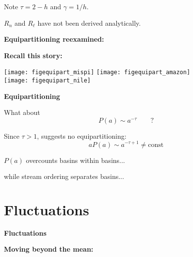 \begin{frame}[label=]
\begin{frame}[label=]
\begin{frame}[label=]
\begin{frame}[label=]
\begin{frame}[label=]
\begin{frame}[label=]
\begin{frame}[label=]
\begin{frame}[label=]
\begin{frame}[label=]
\begin{frame}[label=]
\begin{frame}[label=]
\begin{frame}[label=]
\begin{frame}[label=]
\begin{frame}[label=]
\begin{frame}[label=]
\begin{frame}[label=]
\begin{frame}[label=]
\begin{frame}[label=]
\begin{frame}[label=]
\begin{frame}[label=]
\begin{frame}[label=]
\begin{frame}[label=]
\begin{frame}[label=]
\begin{frame}[label=]
\begin{frame}[label=]
\begin{frame}[label=]
\begin{frame}[label=]
\begin{frame}[label=]
\begin{frame}[label=]
\begin{frame}[label=]
\begin{frame}[label=]
\begin{frame}[label=]
\begin{frame}[label=]
\begin{frame}[label=]
\begin{frame}[label=]
\begin{frame}[label=]
\begin{frame}[label=]
\begin{frame}[label=]
\begin{frame}[label=]
      Note $\tau = 2 - h$ and $\gamma = 1/h$.
    
      $R_n$ and $R_\ell$ have not been derived analytically.
    
  

\begin{frame}[label=]
  \textbf{Equipartitioning reexamined:}

  \textbf{Recall this story:}
    \begin{center}
      \texttt{[image: figequipart\_mispi]}
      \texttt{[image: figequipart\_amazon]}\\
      \texttt{[image: figequipart\_nile]}
    \end{center}
  


  \textbf{Equipartitioning}

  
    
    
      What about 
      $$ P(a) \sim a^{-\tau} \qquad ? $$
    
      Since $\tau > 1$, suggests no equipartitioning:
      $$ aP(a) \sim a^{-\tau+1} \neq \mbox{const} $$
    
      $P(a)$ overcounts basins within basins...
    
      while
      stream ordering separates basins...
    
  



\section{Fluctuations}

\begin{frame}[label=]
    \textbf{Fluctuations}

    \textbf{Moving beyond the mean:}
      

\end{frame}
\end{frame}
\end{frame}
\end{frame}
\end{frame}
\end{frame}
\end{frame}
\end{frame}
\end{frame}
\end{frame}
\end{frame}
\end{frame}
\end{frame}
\end{frame}
\end{frame}
\end{frame}
\end{frame}
\end{frame}
\end{frame}
\end{frame}
\end{frame}
\end{frame}
\end{frame}
\end{frame}
\end{frame}
\end{frame}
\end{frame}
\end{frame}
\end{frame}
\end{frame}
\end{frame}
\end{frame}
\end{frame}
\end{frame}
\end{frame}
\end{frame}
\end{frame}
\end{frame}
\end{frame}
\end{frame}
\end{frame}
